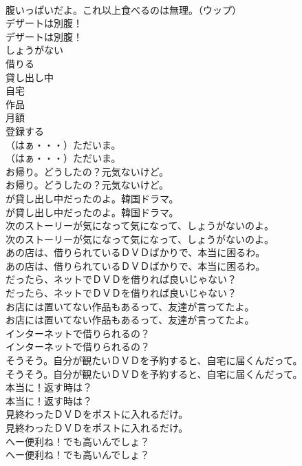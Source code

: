 \documentclass[8pt]{extreport}
\begin{document}
\begin{CJK}{UTF8}{min}
\\	腹いっぱいだよ。これ以上食べるのは無理。（ウップ） 
\\	デザートは別腹！	
\\	デザートは別腹！ 
\\	しょうがない
\\	借りる
\\	貸し出し中
\\	自宅
\\	作品
\\	月額
\\	登録する
\\	（はぁ・・・）ただいま。	
\\	（はぁ・・・）ただいま。 
\\	お帰り。どうしたの？元気ないけど。	
\\	お帰り。どうしたの？元気ないけど。 
\\	が貸し出し中だったのよ。韓国ドラマ。	
\\	が貸し出し中だったのよ。韓国ドラマ。 
\\	次のストーリーが気になって気になって、しょうがないのよ。	
\\	次のストーリーが気になって気になって、しょうがないのよ。 
\\	あの店は、借りられているＤＶＤばかりで、本当に困るわ。	
\\	あの店は、借りられているＤＶＤばかりで、本当に困るわ。 
\\	だったら、ネットでＤＶＤを借りれば良いじゃない？	
\\	だったら、ネットでＤＶＤを借りれば良いじゃない？ 
\\	お店には置いてない作品もあるって、友達が言ってたよ。	
\\	お店には置いてない作品もあるって、友達が言ってたよ。 
\\	インターネットで借りられるの？	
\\	インターネットで借りられるの？ 
\\	そうそう。自分が観たいＤＶＤを予約すると、自宅に届くんだって。	
\\	そうそう。自分が観たいＤＶＤを予約すると、自宅に届くんだって。 
\\	本当に！返す時は？	
\\	本当に！返す時は？ 
\\	見終わったＤＶＤをポストに入れるだけ。	
\\	見終わったＤＶＤをポストに入れるだけ。 
\\	へー便利ね！でも高いんでしょ？	
\\	へー便利ね！でも高いんでしょ？ 

\end{CJK}
\end{document}
